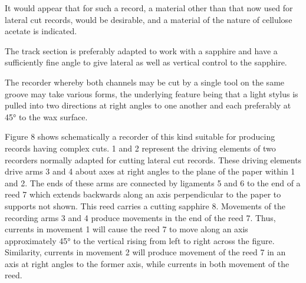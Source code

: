 \documentclass[11pt]{article}
\begin{document}
\begin{multicols*}{2}
It would appear that for such a record, a material other than that now used for lateral cut records, would be desirable, and a material of the nature of cellulose acetate is indicated. 

The track section is preferably adapted to work with a sapphire and have a sufficiently fine angle to give lateral as well as vertical control to the sapphire.
 
The recorder whereby both channels may be cut by a single tool on the same groove may take various forms, the underlying feature being that a light stylus is pulled into two directions at right angles to one another and each preferably at 45° to the wax surface.

Figure 8 shows schematically a recorder of this kind suitable for producing records having complex cuts. 1 and 2 represent the driving elements of two recorders normally adapted for cutting lateral cut records. These driving elements drive arms 3 and 4 about axes at right angles to the plane of the paper within 1 and 2. The ends of these arms are connected by ligaments 5 and 6 to the end of a reed 7 which extends backwards along an axis perpendicular to the paper to supports not shown. This reed carries a cutting sapphire 8. Movements of the recording  arms 3 and 4 produce movements in the end of the reed 7. Thus, currents in movement 1 will cause the reed 7 to move along an axis approximately 45° to the vertical rising from left to right across the figure. Similarity, currents in movement 2 will produce movement of the reed 7 in an axis at right angles to the former axis, while currents in both movement of the reed.


\end{multicols*}
\end{document}
